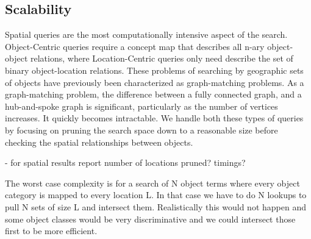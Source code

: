 \subsection{Scalability}

Spatial queries are the most computationally intensive aspect of the search.
Object-Centric queries require a concept map that describes all n-ary object-object relations, where Location-Centric queries only need describe the set of binary object-location relations.
These problems of searching by geographic sets of objects have previously been characterized as graph-matching problems. 
As a graph-matching problem, the difference between a fully connected graph, and a hub-and-spoke graph is significant, particularly as the number of vertices increases. It quickly becomes intractable. 
We handle both these types of queries by focusing on pruning the search space down to a reasonable size before checking the spatial relationships between objects.

- for spatial results report number of locations pruned? timings?


The worst case complexity is for a search of N object terms where every object category is mapped to every location L. In that case we have to do N lookups to pull N sets of size L and intersect them. Realistically this would not happen and some object classes would be very discriminative and we could intersect those first to be more efficient.




